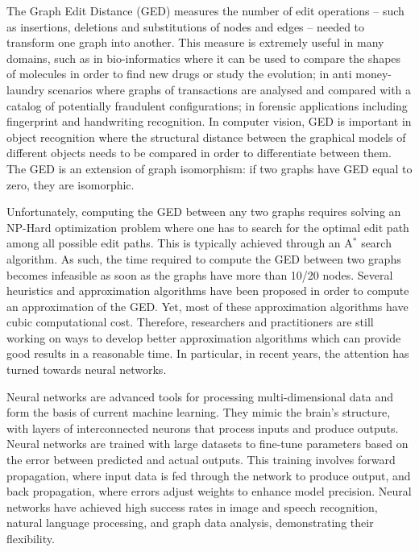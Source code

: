 \documentclass[../Thesis.tex]{subfiles}
\begin{document}
	The Graph Edit Distance (GED) measures the number of edit operations -- such as insertions, deletions and substitutions of nodes and edges -- needed to transform one graph into another. This measure is extremely useful in many domains, such as in bio-informatics where it can be used to compare the shapes of molecules in order to find new drugs or study the evolution; in anti money-laundry scenarios where graphs of transactions are analysed and compared with a catalog of potentially fraudulent configurations; in forensic applications including fingerprint and handwriting recognition. In computer vision, GED is important in object recognition where the structural distance between the graphical models of different objects needs to be compared in order to differentiate between them. The GED is an extension of graph isomorphism: if two graphs have GED equal to zero, they are isomorphic.  
	
	Unfortunately, computing the GED between any two graphs requires solving an NP-Hard optimization problem where one has to search for the optimal edit path among all possible edit paths. This is typically achieved through an A$^*$ search algorithm. As such, the time required to compute the GED between two graphs becomes infeasible as soon as the graphs have more than 10/20 nodes. Several heuristics and approximation algorithms have been proposed in order to compute an approximation of the GED. Yet, most of these approximation algorithms have cubic computational cost. Therefore, researchers and practitioners are still working on ways to develop better approximation algorithms which can provide good results in a reasonable time. In particular, in recent years, the attention has turned towards neural networks.

	Neural networks are advanced tools for processing multi-dimensional data and form the basis of current machine learning. They mimic the brain’s structure, with layers of interconnected  neurons that process inputs and produce outputs. Neural networks are trained with large datasets to fine-tune parameters based on the error between predicted and actual outputs. This training involves forward propagation, where input data is fed through the network to produce output, and back propagation, where errors adjust weights to enhance model precision. Neural networks have achieved high success rates in image and speech recognition, natural language processing, and graph data analysis, demonstrating their flexibility.
	
\end{document}
